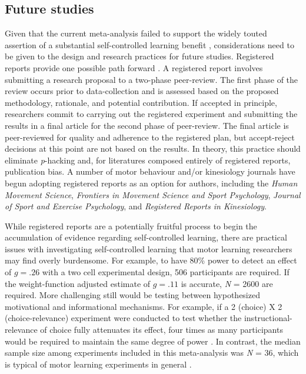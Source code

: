 \documentclass[man,floatsintext,hidelinks]{apa7}
\begin{document}
\subsection{Future studies}
Given that the current meta-analysis failed to support the widely touted assertion of a substantial self-controlled learning benefit \parencite{Sanli2013-xn,Ste-Marie2019-bw,Wulf2016-gf}, considerations need to be given to the design and research practices for future studies. Registered reports provide one possible path forward \parencite{Caldwell2020-jg}. A registered report involves submitting a research proposal to a two-phase peer-review. The first phase of the review occurs prior to data-collection and is assessed based on the proposed methodology, rationale, and potential contribution. If accepted in principle, researchers commit to carrying out the registered experiment and submitting the results in a final article for the second phase of peer-review. The final article is peer-reviewed for quality and adherence to the registered plan, but accept-reject decisions at this point are not based on the results. In theory, this practice should eliminate \emph{p}-hacking and, for literatures composed entirely of registered reports, publication bias. A number of motor behaviour and/or kinesiology journals have begun adopting registered reports as an option for authors, including the \emph{Human Movement Science}, \emph{Frontiers in Movement Science and Sport Psychology}, \emph{Journal of Sport and Exercise Psychology}, and \emph{Registered Reports in Kinesiology}.

While registered reports are a potentially fruitful process to begin the accumulation of evidence regarding self-controlled learning, there are practical issues with investigating self-controlled learning that motor learning researchers may find overly burdensome. For example, to have 80\% power to detect an effect of $g = .26$ with a two cell experimental design, 506 participants are required. If the weight-function adjusted estimate of $g = .11$ is accurate, \emph{N} = 2600 are required. More challenging still would be testing between hypothesized motivational and informational mechanisms. For example, if a 2 (choice) X 2 (choice-relevance) experiment were conducted to test whether the instructional-relevance of choice fully attenuates its effect, four times as many participants would be required to maintain the same degree of power \parencite{Simonsohn2014-blog}. In contrast, the median sample size among experiments included in this meta-analysis was \emph{N} = 36, which is typical of motor learning experiments in general \parencite{Lohse2016-cf}.
\end{document}
